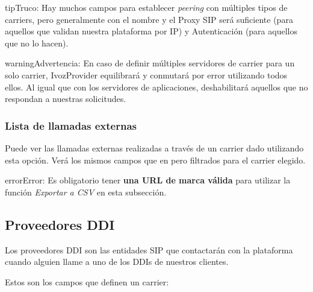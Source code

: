 \documentclass[letterpaper,10pt,spanish]{sphinxmanual}
\begin{document}
\begin{notice}{tip}{Truco:}
Hay muchos campos para establecer \emph{peering} con múltiples tipos de carriers, pero generalmente con el nombre y el Proxy SIP será suficiente (para aquellos que validan nuestra plataforma por IP) y Autenticación (para aquellos que no lo hacen).
\end{notice}

\begin{notice}{warning}{Advertencia:}
En caso de definir múltiples servidores de carrier para un solo carrier, IvozProvider equilibrará y conmutará por error utilizando todos ellos. Al igual que con los servidores de aplicaciones, deshabilitará aquellos que no respondan a nuestras solicitudes.
\end{notice}


\subsubsection{Lista de llamadas externas}
\label{administration_portal/brand/providers/carriers:list-of-external-calls}
Puede ver las llamadas externas realizadas a través de un carrier dado utilizando esta opción. Verá los mismos campos que en {\hyperref[administration_portal/platform/external_calls:external\string-calls]{}} pero filtrados para el carrier elegido.

\begin{notice}{error}{Error:}
Es obligatorio tener \textbf{una URL de marca válida} para utilizar la función \emph{Exportar a CSV} en esta subsección.
\end{notice}


\subsection{Proveedores DDI}
\label{administration_portal/brand/providers/ddi_providers:ddi-providers}\label{administration_portal/brand/providers/ddi_providers::doc}\label{administration_portal/brand/providers/ddi_providers:id1}
Los proveedores DDI son las entidades SIP que contactarán con la plataforma cuando alguien llame a uno de los DDIs de nuestros clientes.

Estos son los campos que definen un carrier:
\end{document}
